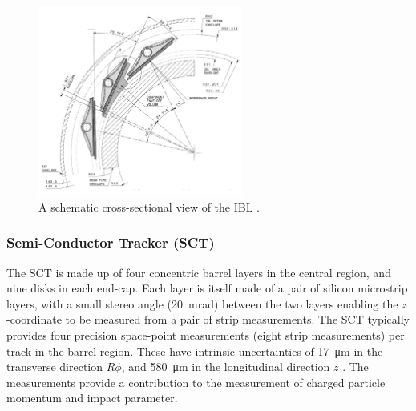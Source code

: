 
\begin{figure}[!htpb]
  \centering
  \includegraphics[width=0.6\textwidth]{chapters/2.detector/figs/atlas_ibl.png}
  \caption{A schematic cross-sectional view of the \ATLAS IBL \cite{ATLAS-TDR-19}.}
  \label{fig:atlas_ibl}
\end{figure}

\subsubsection{Semi-Conductor Tracker (SCT)}
The SCT is made up of four concentric barrel layers in the central region, and nine disks in each end-cap.
Each layer is itself made of a pair of silicon microstrip layers, with a small stereo angle (\SI{20}{\milli\radian}) between the two layers enabling the $z$\nobreakdash-coordinate to be measured from a pair of strip measurements.
The SCT typically provides four precision space-point measurements (eight strip measurements) per track in the barrel region.
These have intrinsic uncertainties of \SI{17}{\micro\meter} in the transverse direction $R\phi$, and \SI{580}{\micro\meter} in the longitudinal direction $z$ \cite{IDET-2013-01}.
The measurements provide a contribution to the measurement of charged particle momentum and impact parameter.



